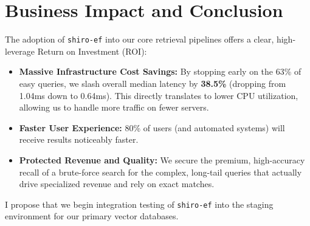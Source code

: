 \documentclass[11pt, a4paper]{article}
\begin{document}

\section{Business Impact and Conclusion}
The adoption of \texttt{shiro-ef} into our core retrieval pipelines offers a clear, high-leverage Return on Investment (ROI):
\begin{itemize}
    \item \textbf{Massive Infrastructure Cost Savings:} By stopping early on the 63\% of easy queries, we slash overall median latency by \textbf{38.5\%} (dropping from 1.04ms down to 0.64ms). This directly translates to lower CPU utilization, allowing us to handle more traffic on fewer servers.
    \item \textbf{Faster User Experience:} 80\% of users (and automated systems) will receive results noticeably faster.
    \item \textbf{Protected Revenue and Quality:} We secure the premium, high-accuracy recall of a brute-force search for the complex, long-tail queries that actually drive specialized revenue and rely on exact matches.
\end{itemize}

I propose that we begin integration testing of \texttt{shiro-ef} into the staging environment for our primary vector databases.
\end{document}
